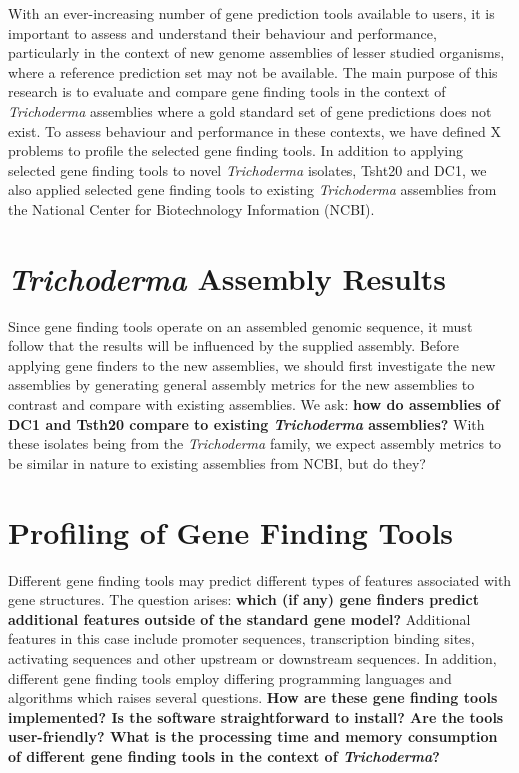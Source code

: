 With an ever-increasing number of gene prediction tools available to
users, it is important to assess and understand their behaviour and
performance, particularly in the context of new genome
assemblies of lesser studied organisms, where a reference prediction
set may not be available. The main purpose of this research is to
evaluate and compare gene finding tools in the context of
\textit{Trichoderma} assemblies where a gold standard set of gene
predictions does not exist. To assess behaviour and performance in
these contexts, we have defined X problems to profile the selected
gene finding tools. In addition to applying selected gene finding
tools to novel \textit{Trichoderma} isolates, Tsht20 and DC1, we also
applied selected gene finding tools to existing \textit{Trichoderma}
assemblies from the National Center for Biotechnology Information
(NCBI).

\section{\textit{Trichoderma} Assembly Results}
\label{rq:assembly-results}

Since gene finding tools operate on an assembled genomic sequence, it
must follow that the results will be influenced by the supplied
assembly. Before applying gene finders to the new assemblies, we
should first investigate the new assemblies by generating general
assembly metrics for the new assemblies to contrast and compare with
existing assemblies. We ask: \textbf{how do assemblies of DC1 and
  Tsth20 compare to existing \textit{Trichoderma} assemblies?} With
these isolates being from the \textit{Trichoderma} family, we expect
assembly metrics to be similar in nature to existing assemblies from
NCBI, but do they?

\section{Profiling of Gene Finding Tools}

Different gene finding tools may predict different types of features
associated with gene structures. The question arises: \textbf{which
  (if any) gene finders predict additional features outside of the
  standard gene model?} Additional features in this case include
promoter sequences, transcription binding sites, activating sequences
and other upstream or downstream sequences. In addition, different
gene finding tools employ differing programming languages and
algorithms which raises several questions. \textbf{How are these gene
  finding tools implemented? Is the software straightforward to
  install? Are the tools user-friendly? What is the processing time
  and memory consumption of different gene finding tools in the
  context of \textit{Trichoderma}?}


